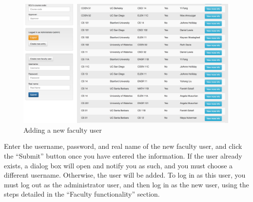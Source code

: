 \documentclass{article}
\begin{document}
\begin{figure}[h]
\includegraphics[width=15cm]{adduser}
\centering
\caption{Adding a new faculty user}
\label{fig:adduser}
\end{figure}

\par Enter the username, password, and real name of the new faculty user, and
click the ``Submit'' button once you have entered the information. If the user
already exists, a dialog box will open and notify you as such, and you must
choose a different username. Otherwise, the user will be added. To log in as
this user, you must log out as the administrator user, and then log in as the
new user, using the steps detailed in the ``Faculty functionality'' section.
\end{document}
